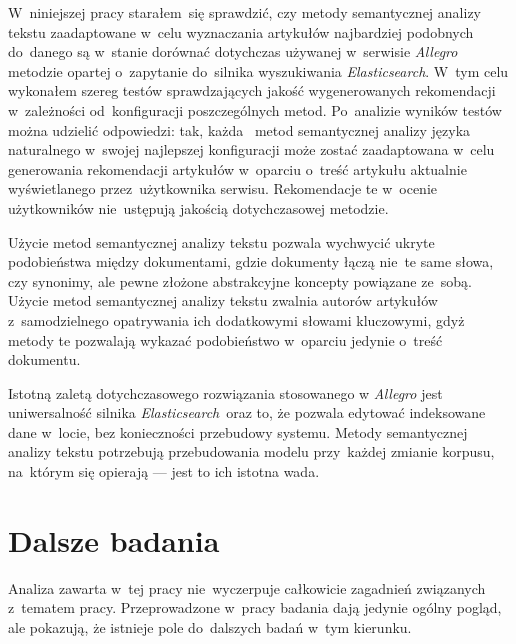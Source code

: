\documentclass[pl]{minipw} %
\begin{document}
W~niniejszej pracy starałem~się sprawdzić, czy metody semantycznej analizy tekstu zaadaptowane w~celu wyznaczania artykułów najbardziej podobnych do~danego są w~stanie dorównać dotychczas używanej w~serwisie \textit{Allegro} metodzie opartej o~zapytanie do~silnika wyszukiwania \textit{Elasticsearch}. W~tym celu wykonałem szereg testów sprawdzających jakość wygenerowanych rekomendacji w~zależności od~konfiguracji poszczególnych metod. Po~analizie wyników testów można udzielić odpowiedzi: tak, każda~ metod semantycznej analizy języka naturalnego w~swojej najlepszej konfiguracji może zostać zaadaptowana w~celu generowania rekomendacji artykułów w~oparciu o~treść artykułu aktualnie wyświetlanego przez~użytkownika serwisu. Rekomendacje te w~ocenie użytkowników nie~ustępują jakością dotychczasowej metodzie. 

Użycie metod semantycznej analizy tekstu pozwala wychwycić ukryte podobieństwa między dokumentami, gdzie dokumenty łączą nie~te same słowa, czy synonimy, ale pewne złożone abstrakcyjne koncepty powiązane ze~sobą. Użycie metod semantycznej analizy tekstu zwalnia autorów artykułów z~samodzielnego opatrywania ich dodatkowymi słowami kluczowymi, gdyż metody te pozwalają wykazać podobieństwo w~oparciu jedynie o~treść dokumentu.

Istotną zaletą dotychczasowego rozwiązania stosowanego w \textit{Allegro} jest uniwersalność silnika \textit{Elasticsearch}~oraz to, że pozwala edytować indeksowane dane w~locie, bez konieczności przebudowy systemu. Metody semantycznej analizy tekstu potrzebują przebudowania modelu przy~każdej zmianie korpusu, na~którym się opierają --- jest to ich istotna wada.


\section{Dalsze badania}

Analiza zawarta w~tej pracy nie~wyczerpuje całkowicie zagadnień związanych z~tematem pracy. Przeprowadzone w~pracy badania dają jedynie ogólny pogląd, ale pokazują, że istnieje pole do~dalszych badań w~tym kierunku.
\end{document}

